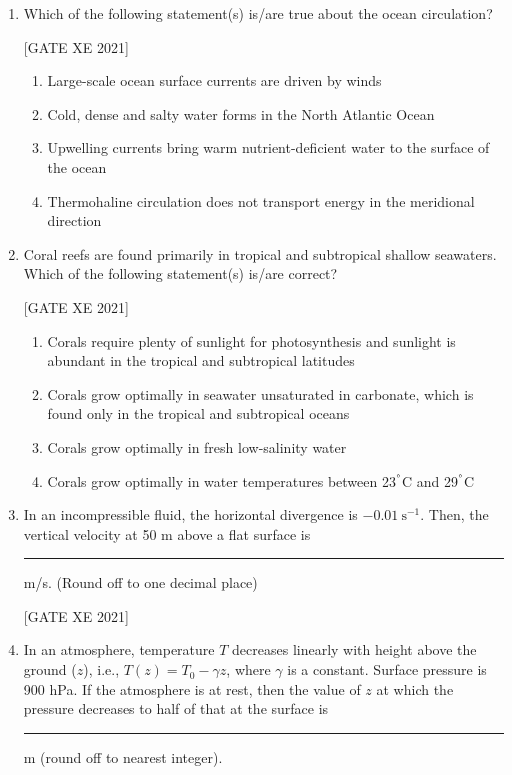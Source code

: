 \documentclass[journal,12pt,onecolumn]{IEEEtran}
\theoremstyle{remark}
\begin{document}
\begin{enumerate}[resume]
\item Which of the following statement(s) is/are true about the ocean circulation?

\hfill[GATE XE 2021]

\begin{multicols}{2}
\begin{enumerate}
\item Large-scale ocean surface currents are driven by winds
\item Cold, dense and salty water forms in the North Atlantic Ocean
\item Upwelling currents bring warm nutrient-deficient water to the surface of the ocean
\item Thermohaline circulation does not transport energy in the meridional direction
\end{enumerate}
\end{multicols}


\item Coral reefs are found primarily in tropical and subtropical shallow seawaters. Which of the following statement(s) is/are correct?

\hfill[GATE XE 2021]

\begin{multicols}{2}
\begin{enumerate}
\item Corals require plenty of sunlight for photosynthesis and sunlight is abundant in the tropical and subtropical latitudes
\item Corals grow optimally in seawater unsaturated in carbonate, which is found only in the tropical and subtropical oceans
\item Corals grow optimally in fresh low-salinity water
\item Corals grow optimally in water temperatures between 23$^\degree$C and 29$^\degree$C
\end{enumerate}
\end{multicols}


\item In an incompressible fluid, the horizontal divergence is $-0.01\ \text{s}^{-1}$. Then, the vertical velocity at 50 m above a flat surface is \rule{3cm}{0.15mm} m/s. (Round off to one decimal place)

\hfill[GATE XE 2021]


\item In an atmosphere, temperature $T$ decreases linearly with height above the ground ($z$), i.e., $T(z) = T_0 - \gamma z$, where $\gamma$ is a constant. Surface pressure is 900 hPa. If the atmosphere is at rest, then the value of $z$ at which the pressure decreases to half of that at the surface is \rule{3cm}{0.15mm} m (round off to nearest integer).  


\end{enumerate}
\end{document}
